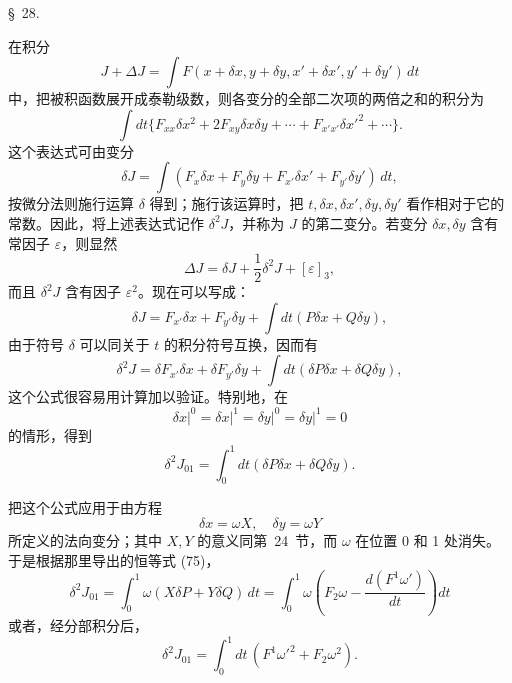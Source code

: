\documentclass[11pt,a4paper,leqno]{article}
\begin{document}
\begin{center}{\large \S~28.}\end{center}

在积分
\[
J+\Delta J=\int F(x+\delta x,y+\delta y,x'+\delta x',y'+\delta y')\,dt
\]
中，把被积函数展开成泰勒级数，则各变分的全部二次项的两倍之和的积分为
\[
\int dt\{F_{xx}\delta x^2+2F_{xy}\delta x\delta y+\cdots+F_{x'x'}\delta x'^2+\cdots\}.
\]
这个表达式可由变分
\[
\delta J=\int(F_x\delta x+F_y\delta y+F_{x'}\delta x'+F_{y'}\delta y')\,dt,
\]
按微分法则施行运算 $\delta$ 得到；施行该运算时，把 $t,\delta x,\delta x',\delta y,\delta y'$ 看作相对于它的常数。因此，将上述表达式记作 $\delta^2J$，并称为 $J$ 的第二变分。若变分 $\delta x,\delta y$ 含有常因子 $\varepsilon$，则显然
\begin{equation}\tag{88}
\Delta J=\delta J+\frac12\delta^2J+[\varepsilon]_3,
\end{equation}
而且 $\delta^2J$ 含有因子 $\varepsilon^2$。现在可以写成：
\[
\delta J=F_{x'}\delta x+F_{y'}\delta y+
\int dt(P\delta x+Q\delta y),
\]
由于符号 $\delta$ 可以同关于 $t$ 的积分符号互换，因而有
\[
\delta^2J=\delta F_{x'}\delta x+\delta F_{y'}\delta y+
\int dt(\delta P\delta x+\delta Q\delta y),
\]
这个公式很容易用计算加以验证。特别地，在
\[
\left.\delta x\right|^0=\left.\delta x\right|^1=
\left.\delta y\right|^0=\left.\delta y\right|^1=0
\]
的情形，得到
\[
\delta^2J_{01}=\int_0^1dt(\delta P\delta x+
\delta Q\delta y).
\]

把这个公式应用于由方程
\[
\delta x=\omega X,
\quad
\delta y=\omega Y
\]
所定义的法向变分；其中 $X,Y$ 的意义同第~24~节，而 $\omega$ 在位置 0 和 1 处消失。于是根据那里导出的恒等式 (75)，
\begin{equation}\tag{89}
\delta^2J_{01}=\int_0^1\omega(X\delta P+Y\delta Q)\,dt
=\int_0^1\omega\left(F_2\omega-\frac{d(F^1\omega')}{dt}\right)dt
\end{equation}
或者，经分部积分后，
\begin{equation}\tag{90}
\delta^2J_{01}=\int_0^1dt\,(F^1\omega'^2+F_2\omega^2).
\end{equation}
\end{document}
